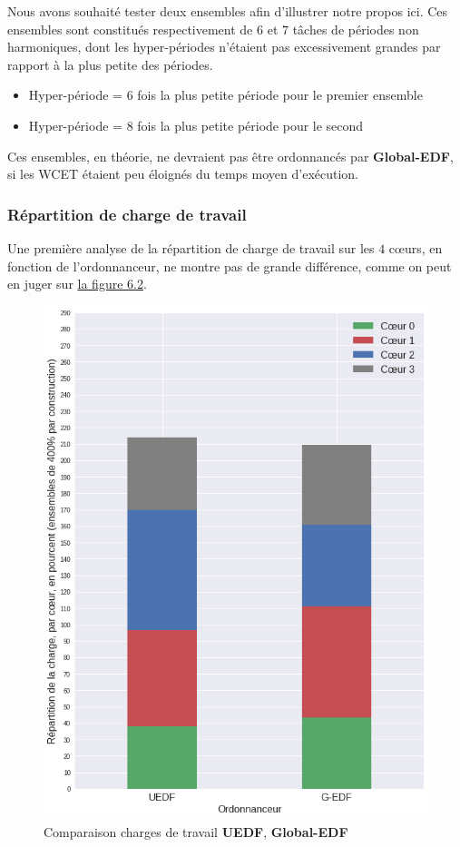 	Nous avons souhaité tester deux ensembles afin d'illustrer notre propos ici. Ces ensembles sont
	constitués respectivement de $6$ et $7$ tâches de périodes 
	non harmoniques, dont les hyper-périodes n'étaient pas excessivement grandes par rapport à la plus petite des périodes.
	\begin{itemize}
		\item Hyper-période = $6$ fois la plus petite période pour le premier ensemble
		\item Hyper-période = $8$ fois la plus petite période pour le second
	\end{itemize}
	Ces ensembles, en théorie, ne devraient pas être ordonnancés par \textbf{Global-EDF}, si les WCET étaient peu éloignés du temps 
	moyen d'exécution. \cite{globalsustainability} \newline
	
	
	\subsubsection{Répartition de charge de travail}
	Une première analyse de la répartition de charge de travail sur les $4$ cœurs, en fonction de l'ordonnanceur, 
	ne montre pas de grande différence, comme on peut en juger sur \hyperref[3tasksmigrations]{la figure 6.2}.
	
	\begin{figure}[H]
		\label{3tasksmigrations}
		\caption{Comparaison charges de travail \textbf{UEDF}, \textbf{Global-EDF}}
		\includegraphics[scale=0.6]{img/wcet/repartitiondecharges_migrations.png}
	\end{figure}
	
